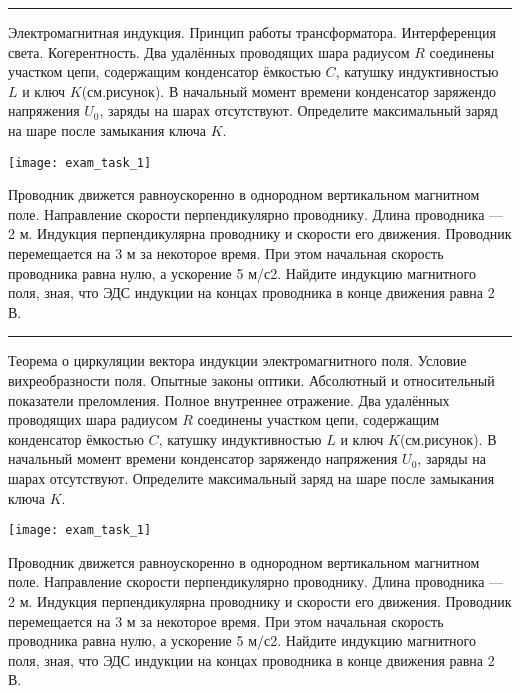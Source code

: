 \documentclass[a5paper, landscape]{exam}
\begin{document}
\rule{1\textwidth}{0.4pt}
\begin{questions}
\question Электромагнитная индукция. Принцип работы трансформатора.
\question Интерференция света. Когерентность.
\question Два удалённых проводящих шара радиусом $R$ соединены участком цепи, содержащим конденсатор ёмкостью $C$, катушку индуктивностью $L$ и ключ $K$(см.рисунок). В начальный момент времени конденсатор заряжендо напряжения $U_0$, заряды на шарах отсутствуют. Определите максимальный заряд на шаре после замыкания ключа $K$.

\texttt{[image: exam\_task\_1]}


\question Проводник движется равноускоренно в однородном вертикальном магнитном поле. Направление скорости перпендикулярно проводнику. Длина проводника — 2 м. Индукция перпендикулярна проводнику и скорости его движения. Проводник перемещается на 3 м за некоторое время. При этом начальная скорость проводника равна нулю, а ускорение 5 м/с2. Найдите индукцию магнитного поля, зная, что ЭДС индукции на концах проводника в конце движения равна 2 В.
\end{questions}

\newpage
\rule{1\textwidth}{0.4pt}
\begin{questions}
\question Теорема о циркуляции вектора индукции электромагнитного поля. Условие вихреобразности поля.
\question Опытные законы оптики. Абсолютный и относительный показатели преломления. Полное внутреннее отражение. 
\question Два удалённых проводящих шара радиусом $R$ соединены участком цепи, содержащим конденсатор ёмкостью $C$, катушку индуктивностью $L$ и ключ $K$(см.рисунок). В начальный момент времени конденсатор заряжендо напряжения $U_0$, заряды на шарах отсутствуют. Определите максимальный заряд на шаре после замыкания ключа $K$.

\texttt{[image: exam\_task\_1]}


\question Проводник движется равноускоренно в однородном вертикальном магнитном поле. Направление скорости перпендикулярно проводнику. Длина проводника — 2 м. Индукция перпендикулярна проводнику и скорости его движения. Проводник перемещается на 3 м за некоторое время. При этом начальная скорость проводника равна нулю, а ускорение 5 м/с2. Найдите индукцию магнитного поля, зная, что ЭДС индукции на концах проводника в конце движения равна 2 В.
\end{questions}
\end{document}
